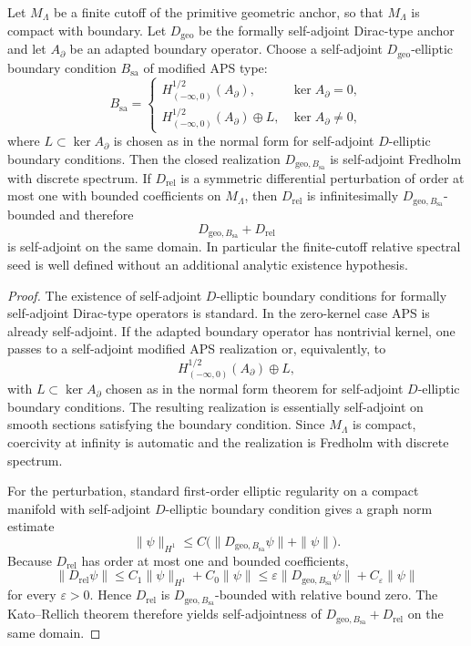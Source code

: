 \begin{theorem}
\label{thm:well-posed-primitive-dynamics}
\label{thm:primitive-selfadjoint-realization}
Let $M_\Lambda$ be a finite cutoff of the primitive geometric anchor, so that $M_\Lambda$ is
compact with boundary. Let $D_{\mathrm{geo}}$ be the formally self-adjoint Dirac-type anchor and
let $A_\partial$ be an adapted boundary operator. Choose a self-adjoint $D_{\mathrm{geo}}$-elliptic
boundary condition $B_{\mathrm{sa}}$ of modified APS type:
\[
B_{\mathrm{sa}}=
\begin{cases}
H^{1/2}_{(-\infty,0)}(A_\partial), & \ker A_\partial=0,\\[2mm]
H^{1/2}_{(-\infty,0)}(A_\partial)\oplus L, & \ker A_\partial\neq0,
\end{cases}
\]
where $L\subset\ker A_\partial$ is chosen as in the normal form for self-adjoint $D$-elliptic
boundary conditions. Then the closed realization $D_{\mathrm{geo},B_{\mathrm{sa}}}$ is self-adjoint
Fredholm with discrete spectrum. If $D_{\mathrm{rel}}$ is a symmetric differential perturbation of
order at most one with bounded coefficients on $M_\Lambda$, then $D_{\mathrm{rel}}$ is
infinitesimally $D_{\mathrm{geo},B_{\mathrm{sa}}}$-bounded and therefore
\[
D_{\mathrm{geo},B_{\mathrm{sa}}}+D_{\mathrm{rel}}
\]
is self-adjoint on the same domain. In particular the finite-cutoff relative spectral seed is well
defined without an additional analytic existence hypothesis.
\end{theorem}

\begin{proof}
The existence of self-adjoint $D$-elliptic boundary conditions for formally self-adjoint Dirac-type
operators is standard. In the zero-kernel case APS is already self-adjoint. If the adapted
boundary operator has nontrivial kernel, one passes to a self-adjoint modified APS realization or,
equivalently, to
\[
H^{1/2}_{(-\infty,0)}(A_\partial)\oplus L,
\]
with $L\subset\ker A_\partial$ chosen as in the normal form theorem for self-adjoint $D$-elliptic
boundary conditions. The resulting realization is essentially self-adjoint on smooth sections
satisfying the boundary condition. Since $M_\Lambda$ is compact, coercivity at infinity is
automatic and the realization is Fredholm with discrete spectrum.

For the perturbation, standard first-order elliptic regularity on a compact manifold with
self-adjoint $D$-elliptic boundary condition gives a graph norm estimate
\[
\|\psi\|_{H^1}\le C\bigl(\|D_{\mathrm{geo},B_{\mathrm{sa}}}\psi\|+\|\psi\|\bigr).
\]
Because $D_{\mathrm{rel}}$ has order at most one and bounded coefficients,
\[
\|D_{\mathrm{rel}}\psi\|
\le
C_1\|\psi\|_{H^1}+C_0\|\psi\|
\le
\varepsilon\|D_{\mathrm{geo},B_{\mathrm{sa}}}\psi\|+C_\varepsilon\|\psi\|
\]
for every $\varepsilon>0$. Hence $D_{\mathrm{rel}}$ is $D_{\mathrm{geo},B_{\mathrm{sa}}}$-bounded
with relative bound zero. The Kato--Rellich theorem therefore yields self-adjointness of
$D_{\mathrm{geo},B_{\mathrm{sa}}}+D_{\mathrm{rel}}$ on the same domain.
\end{proof}

